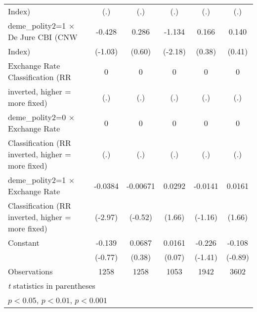 {\begin{tabular}{l*{5}{c}}
Index)                                  &       (.)         &       (.)         &       (.)         &       (.)         &       (.)         \\
\addlinespace
deme\_polity2=1 $\times$ De Jure CBI (CNW&    -0.428         &     0.286         &    -1.134\sym{*}  &     0.166         &     0.140         \\
Index)                                  &   (-1.03)         &    (0.60)         &   (-2.18)         &    (0.38)         &    (0.41)         \\
\addlinespace
Exchange Rate Classification (RR        &         0         &         0         &         0         &         0         &         0         \\
inverted, higher = more fixed)          &       (.)         &       (.)         &       (.)         &       (.)         &       (.)         \\
\addlinespace
deme\_polity2=0 $\times$ Exchange Rate   &         0         &         0         &         0         &         0         &         0         \\
Classification (RR inverted, higher = more fixed)&       (.)         &       (.)         &       (.)         &       (.)         &       (.)         \\
\addlinespace
deme\_polity2=1 $\times$ Exchange Rate   &   -0.0384\sym{**} &  -0.00671         &    0.0292         &   -0.0141         &    0.0161         \\
Classification (RR inverted, higher = more fixed)&   (-2.97)         &   (-0.52)         &    (1.66)         &   (-1.16)         &    (1.66)         \\
\addlinespace
Constant                                &    -0.139         &    0.0687         &    0.0161         &    -0.226         &    -0.108         \\
                                        &   (-0.77)         &    (0.38)         &    (0.07)         &   (-1.41)         &   (-0.89)         \\
\midrule
Observations                            &      1258         &      1258         &      1053         &      1942         &      3602         \\
\bottomrule
\multicolumn{6}{l}{\footnotesize \textit{t} statistics in parentheses}\\
\multicolumn{6}{l}{\footnotesize \sym{*} \(p<0.05\), \sym{**} \(p<0.01\), \sym{***} \(p<0.001\)}\\
\end{tabular}
}

